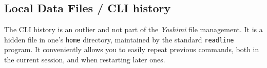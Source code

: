 \subsection{Local Data Files / CLI history}
\label{subsec:local_data_cli_history}
   The CLI history is an outlier and not part of the \textsl{Yoshimi} file
   management. It is a hidden file in one's \texttt{home} directory, maintained
   by the standard \texttt{readline} program.
   It conveniently allows you to easily repeat previous commands, both in the
   current session, and when restarting later ones.


